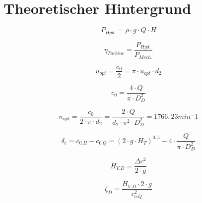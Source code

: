 \section{Theoretischer Hintergrund}

\begin{equation}
    P_{Hyd.} = \rho \cdot g \cdot Q \cdot H
    \label{eq:230514_hydraulische_Leistung}
  \end{equation}

  \begin{equation}
    \eta_{Turbine} = \frac{P_{Hyd.}}{P_{Mech.}}
    \label{eq:230512_Turbinenwirkungsgrad}
  \end{equation}

  \begin{equation}
    u_{opt} = \frac{c_{0}}{2}=\pi \cdot u_{opt} \cdot d_{2}
    \label{eq:230515_umlaufgeschwindigkeit}
  \end{equation}

  \begin{equation}
    c_{0}=\frac{4 \cdot Q}{\pi \cdot D_{D}^2}
      \label{eq:230515_austrittsgeschwindigkeit}
    \end{equation}
    
    
    \begin{equation}
     n_{opt}=\frac{c_{0}}{2 \cdot \pi \cdot d_{2}}=\frac{2 \cdot Q}{d_{2} \cdot \pi^2  \cdot D_{D}^2}=1766,23  min^-1
    \label{eq:230515_n-optimal}
    \end{equation}

    \begin{equation}
        \delta_c = c_{0.H} - c_{0.Q} = ( 2\cdot g \cdot H_T)^{0,5} - 4\cdot \frac{Q}{\pi \cdot D_D^2}
    \end{equation}

    \begin{equation}
        H_{V.D} = \frac{\Delta c^2}{2\cdot g}
    \end{equation}
        
     \begin{equation}
        \zeta_D = \frac{H_{V.D} \cdot 2 \cdot g}{c_{o.Q}^2}
    \end{equation}